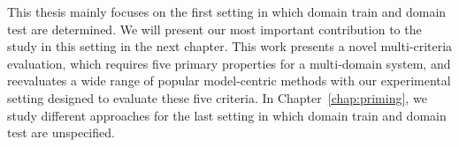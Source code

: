 This thesis mainly focuses on the first setting in which domain train and domain test are determined. We will present our most important contribution to the study in this setting in the next chapter. This work presents a novel multi-criteria evaluation, which requires five primary properties for a multi-domain system, and reevaluates a wide range of popular model-centric methods with our experimental setting designed to evaluate these five criteria. In Chapter~\ref{chap:priming}, we study different approaches for the last setting in which domain train and domain test are unspecified.






























































































